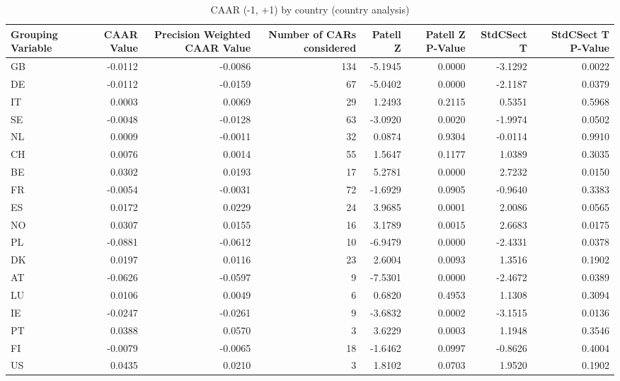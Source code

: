 \begin{table}
\caption{CAAR (-1, +1) by country (country analysis)}
\label{tab:country_caar}
\begin{tabular}{lrrrrrrr}
\toprule
Grouping Variable & CAAR Value & Precision Weighted CAAR Value & Number of CARs considered & Patell Z & Patell Z P-Value & StdCSect T & StdCSect T P-Value \\
\midrule
GB & -0.0112 & -0.0086 & 134 & -5.1945 & 0.0000 & -3.1292 & 0.0022 \\
DE & -0.0112 & -0.0159 & 67 & -5.0402 & 0.0000 & -2.1187 & 0.0379 \\
IT & 0.0003 & 0.0069 & 29 & 1.2493 & 0.2115 & 0.5351 & 0.5968 \\
SE & -0.0048 & -0.0128 & 63 & -3.0920 & 0.0020 & -1.9974 & 0.0502 \\
NL & 0.0009 & -0.0011 & 32 & 0.0874 & 0.9304 & -0.0114 & 0.9910 \\
CH & 0.0076 & 0.0014 & 55 & 1.5647 & 0.1177 & 1.0389 & 0.3035 \\
BE & 0.0302 & 0.0193 & 17 & 5.2781 & 0.0000 & 2.7232 & 0.0150 \\
FR & -0.0054 & -0.0031 & 72 & -1.6929 & 0.0905 & -0.9640 & 0.3383 \\
ES & 0.0172 & 0.0229 & 24 & 3.9685 & 0.0001 & 2.0086 & 0.0565 \\
NO & 0.0307 & 0.0155 & 16 & 3.1789 & 0.0015 & 2.6683 & 0.0175 \\
PL & -0.0881 & -0.0612 & 10 & -6.9479 & 0.0000 & -2.4331 & 0.0378 \\
DK & 0.0197 & 0.0116 & 23 & 2.6004 & 0.0093 & 1.3516 & 0.1902 \\
AT & -0.0626 & -0.0597 & 9 & -7.5301 & 0.0000 & -2.4672 & 0.0389 \\
LU & 0.0106 & 0.0049 & 6 & 0.6820 & 0.4953 & 1.1308 & 0.3094 \\
IE & -0.0247 & -0.0261 & 9 & -3.6832 & 0.0002 & -3.1515 & 0.0136 \\
PT & 0.0388 & 0.0570 & 3 & 3.6229 & 0.0003 & 1.1948 & 0.3546 \\
FI & -0.0079 & -0.0065 & 18 & -1.6462 & 0.0997 & -0.8626 & 0.4004 \\
US & 0.0435 & 0.0210 & 3 & 1.8102 & 0.0703 & 1.9520 & 0.1902 \\
\bottomrule
\end{tabular}
\end{table}
